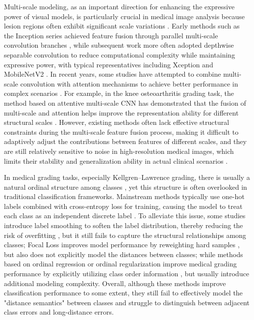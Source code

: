 \documentclass[letterpaper, 10 pt, conference]{ieeeconf}  %
\begin{document}
Multi-scale modeling, as an important direction for enhancing the expressive power of visual models, is particularly crucial in medical image analysis because lesion regions often exhibit significant scale variations \cite{1}. Early methods such as the Inception series achieved feature fusion through parallel multi-scale convolution branches \cite{13}, while subsequent work more often adopted depthwise separable convolution to reduce computational complexity while maintaining expressive power, with typical representatives including Xception and MobileNetV2 \cite{14}\cite{15}. In recent years, some studies have attempted to combine multi-scale convolution with attention mechanisms to achieve better performance in complex scenarios \cite{7}\cite{8}\cite{20}\cite{22}. For example, in the knee osteoarthritis grading task, the method based on attentive multi-scale CNN has demonstrated that the fusion of multi-scale and attention helps improve the representation ability for different structural scales \cite{8}. However, existing methods often lack effective structural constraints during the multi-scale feature fusion process, making it difficult to adaptively adjust the contributions between features of different scales, and they are still relatively sensitive to noise in high-resolution medical images, which limits their stability and generalization ability in actual clinical scenarios \cite{8}\cite{20}\cite{23}.


In medical grading tasks, especially Kellgren–Lawrence grading, there is usually a natural ordinal structure among classes \cite{2}\cite{3}\cite{10}\cite{18}\cite{19}\cite{20}\cite{21}\cite{22}, yet this structure is often overlooked in traditional classification frameworks. Mainstream methods typically use one-hot labels combined with cross-entropy loss for training, causing the model to treat each class as an independent discrete label \cite{9}\cite{10}. To alleviate this issue, some studies introduce label smoothing to soften the label distribution, thereby reducing the risk of overfitting \cite{11}, but it still fails to capture the structural relationships among classes; Focal Loss improves model performance by reweighting hard samples \cite{17}, but also does not explicitly model the distances between classes; while methods based on ordinal regression or ordinal regularization improve medical grading performance by explicitly utilizing class order information \cite{3}\cite{9}\cite{10}, but usually introduce additional modeling complexity. Overall, although these methods improve classification performance to some extent, they still fail to effectively model the "distance semantics" between classes and struggle to distinguish between adjacent class errors and long-distance errors.
\end{document}
